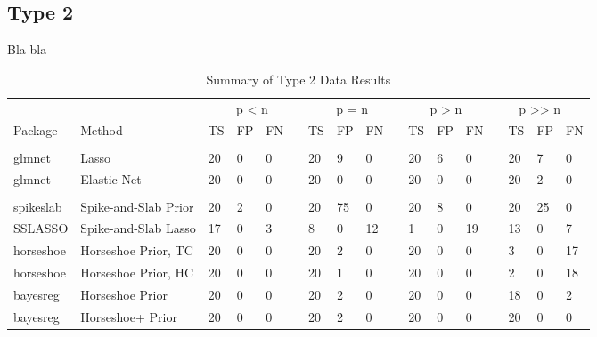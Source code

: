 \documentclass[
  11pt,
]{article}
\begin{document}
\subsection{Type 2}

Bla bla

\begin{table}[!h]

\caption{\label{tab:Results T2}Summary of Type 2 Data Results}
\centering
\fontsize{8.5}{10.5}\selectfont
\begin{tabular}[t]{>{}l|>{}l|>{}l|>{}l|>{}l|>{}l|>{}l|>{}l|>{}l|>{}l|>{}l|>{}l|>{}l|>{}l|>{}l|>{}l|>{}l|}
\toprule
\multicolumn{2}{c}{ } & \multicolumn{4}{c}{p < n} & \multicolumn{4}{c}{p = n} & \multicolumn{3}{c}{p > n} & \multicolumn{4}{c}{p >> n} \\
\cmidrule(l{3pt}r{3pt}){3-6} \cmidrule(l{3pt}r{3pt}){7-10} \cmidrule(l{3pt}r{3pt}){11-13} \cmidrule(l{3pt}r{3pt}){14-17}
Package & Method & TS & FP & FN &  & TS & FP & FN &  & TS & FP & FN &  & TS & FP & FN\\
\midrule
\addlinespace[0.3em]
\multicolumn{17}{l}{\textbf{Frequentist Methods}}\\
\hspace{1em}glmnet & Lasso & 20 & 0 & 0 &  & 20 & 9 & 0 &  & 20 & 6 & 0 &  & 20 & 7 & 0\\
\hspace{1em}glmnet & Elastic Net & 20 & 0 & 0 &  & 20 & 0 & 0 &  & 20 & 0 & 0 &  & 20 & 2 & 0\\
\addlinespace[0.3em]
\multicolumn{17}{l}{\textbf{Bayesian Methods}}\\
\hspace{1em}spikeslab & Spike-and-Slab Prior & 20 & 2 & 0 &  & 20 & 75 & 0 &  & 20 & 8 & 0 &  & 20 & 25 & 0\\
\hspace{1em}SSLASSO & Spike-and-Slab Lasso & 17 & 0 & 3 &  & 8 & 0 & 12 &  & 1 & 0 & 19 &  & 13 & 0 & 7\\
\hspace{1em}horseshoe & Horseshoe Prior, TC & 20 & 0 & 0 &  & 20 & 2 & 0 &  & 20 & 0 & 0 &  & 3 & 0 & 17\\
\hspace{1em}horseshoe & Horseshoe Prior, HC & 20 & 0 & 0 &  & 20 & 1 & 0 &  & 20 & 0 & 0 &  & 2 & 0 & 18\\
\hspace{1em}bayesreg & Horseshoe Prior & 20 & 0 & 0 &  & 20 & 2 & 0 &  & 20 & 0 & 0 &  & 18 & 0 & 2\\
\hspace{1em}bayesreg & Horseshoe+ Prior & 20 & 0 & 0 &  & 20 & 2 & 0 &  & 20 & 0 & 0 &  & 20 & 0 & 0\\

\end{tabular}
\end{table}
\end{document}
